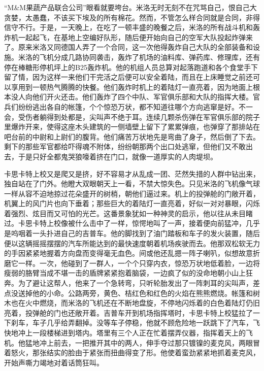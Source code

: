     “M&M果蔬产品联合公司”眼看就要垮台。米洛无时无刻不在咒骂自己，恨自己大贪婪，太愚蠢，不该买下埃及的所有棉花。然而，不管怎么样合同就是合同，非得信守不行。于是，一天晚上，在吃了一顿丰盛的晚餐之后，米洛的所有战斗机和轰炸机一起起飞，在基地上空编好队形，随后便开始向自己的空军大队投起炸弹来了。原来米洛又同德国人弄了一个合同，这一次他得轰炸自己大队的全部装备和设施。米洛的飞机分成几路协同袭击，轰炸了机场的油料库、弹药库、修理库，还有停在棒糖形停机坪上的B25轰炸机。他的机组人员总算对起落跑道和各个食堂手下留了情，因为这样一来他们干完活之后便可以安全着陆，而且在上床睡觉之前还可以享用到一顿热气腾腾的快餐。他们轰炸时机上的着陆灯一直亮着，因为地面上根本没人向他们开火还击。他们轰炸了四个中队、军官俱乐部和大队的指挥大楼。官兵们纷纷逃出各自的帐篷，个个惊恐万状，都不知道往哪个方向逃窜是好。不一会，受伤者躺得到处都是，尖叫声不绝于耳。连续几颗杀伤弹在军官俱乐部的院子里爆炸开来，使得这座木头建筑的一侧墙壁上留下了累累弹痕，也弹穿了那排站在吧台前的中尉和上尉们的腹背。他们痛苦万状地先是弯曲了身子，然后倒了下去。剩下的那些军官都给吓得魂不附体，纷纷朝那两个出口处逃窜，但他们又不敢出去，于是只好全都鬼哭狼嚎着挤在门口，就像一道厚实的人肉堤坝。

    卡思卡特上校又是爬又是挤，好不容易才从乱成一团、茫然失措的人群中钻出来，独自站在了门外。他瞪大双眼朝天上一看，不禁大惊失色。只见米洛的飞机像气球一样从容不迫地掠过花朵盛开的树梢，朝他们逼过来。机上的投弹舱的门敞开着，机翼上的风门片也向下垂着；那些巨大的着陆灯一直亮着，好似一对对暴眼，闪烁着强烈、炫目而又可怕的光芒。这番景象犹如一种神灵的启示，他以往从未目睹过。卡思卡特上校像被什么击中了一样，惊愕地叫了一声，接着便向前猛冲，几乎是呜咽着一头扑进自己的吉普车。他的脚找到了油门踏板和车子的发火装置，随后便以这辆摇摇摆摆的汽车所能达到的最快速度朝着机场疾驶而去。他那双松软无力的手因紧紧地握着方向盘而变得毫无血色。间或他还乱摁一阵子喇叭，似想故意折磨它一样。一次，他碰到了一群人，一个个只穿内衣，惊恐万状地低着脸，一边将瘦弱的胳臂当成不堪一击的盾牌紧紧抱着脑袋，一边疯了似的没命地朝小山上狂奔。为了避让这帮人，他来了一个急转弯，只听轮胎发出了一阵刺耳的尖叫声，差点没送掉他的小命。公路两旁，黄色、桔红色和红色的火焰在熊熊燃烧。帐篷和树木也在火中燃烧，而米洛的飞机还在不断地盘旋，不停地闪烁着的白色着陆灯仍旧亮着，投弹舱的门也还敞开着。吉普车开到机场指挥塔时，卡思卡特上校猛拉了一下刹车，车子几乎给弄翻掉。没等车子停稳，他就不顾危险地一跃跳下了汽车，飞快地冲上一段楼梯进到塔内。塔里有三个人正在忙着摆弄仪器，指挥着天上的飞机。他猛地冲上前去，一把推开其中的两人，伸手夺过那只镀镍的麦克风，两眼冒着怒火，那张结实的脸由于紧张而扭曲得变了形。他使着蛮劲紧紧地抓着麦克风，开始声嘶力竭地对着话筒狂叫。


